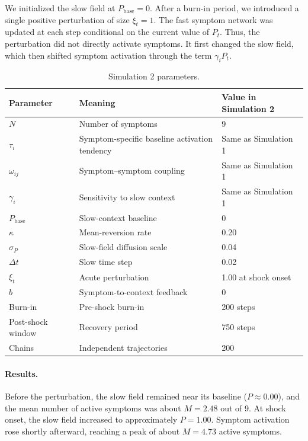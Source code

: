 \documentclass[man,12pt,floatsintext]{apa7}
\begin{document}
We initialized the slow field at \(P_{\mathrm{base}}=0\). After a burn-in
period, we introduced a single positive perturbation of size \(\xi_t=1\). The
fast symptom network was updated at each step conditional on the current value
of \(P_t\). Thus, the perturbation did not directly activate symptoms. It first
changed the slow field, which then shifted symptom activation through the term
\(\gamma_iP_t\).

\begin{table}[ht]
\centering
\caption{Simulation 2 parameters.}
\label{tab:sim2_parameters}
\begin{tabular}{lll}
\hline
Parameter & Meaning & Value in Simulation 2 \\
\hline
\(N\) & Number of symptoms & 9 \\
\(\tau_i\) & Symptom-specific baseline activation tendency & Same as Simulation 1 \\
\(\omega_{ij}\) & Symptom--symptom coupling & Same as Simulation 1 \\
\(\gamma_i\) & Sensitivity to slow context & Same as Simulation 1 \\
\(P_{\mathrm{base}}\) & Slow-context baseline & 0 \\
\(\kappa\) & Mean-reversion rate & 0.20 \\
\(\sigma_P\) & Slow-field diffusion scale & 0.04 \\
\(\Delta t\) & Slow time step & 0.02 \\
\(\xi_t\) & Acute perturbation & 1.00 at shock onset \\
\(b\) & Symptom-to-context feedback & 0 \\
Burn-in & Pre-shock burn-in & 200 steps \\
Post-shock window & Recovery period & 750 steps \\
Chains & Independent trajectories & 200 \\
\hline
\end{tabular}
\end{table}

\paragraph{Results.}
Before the perturbation, the slow field remained near its baseline
(\(P\approx 0.00\)), and the mean number of active symptoms was about
\(M=2.48\) out of 9. At shock onset, the slow field increased to approximately
\(P=1.00\). Symptom activation rose shortly afterward, reaching a peak of about
\(M=4.73\) active symptoms.
\end{document}
